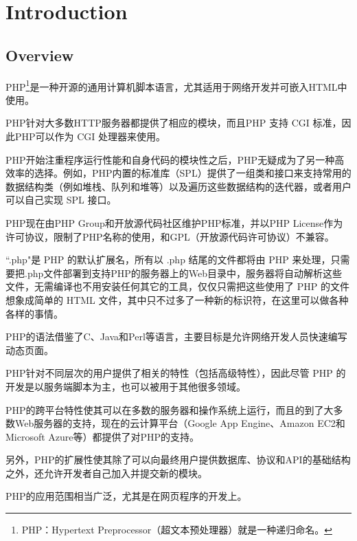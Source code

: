 \part{Introduction}

\chapter{Overview}

PHP\footnote{PHP：Hypertext Preprocessor（超文本预处理器）就是一种递归命名。}是一种开源的通用计算机脚本语言，尤其适用于网络开发并可嵌入HTML中使用。


PHP针对大多数HTTP服务器都提供了相应的模块，而且PHP 支持 CGI 标准，因此PHP可以作为 CGI 处理器来使用。

PHP开始注重程序运行性能和自身代码的模块性之后，PHP无疑成为了另一种高效率的选择。例如，PHP内置的标准库（SPL）提供了一组类和接口来支持常用的数据结构类（例如堆栈、队列和堆等）以及遍历这些数据结构的迭代器，或者用户可以自己实现 SPL 接口。




PHP现在由PHP Group和开放源代码社区维护PHP标准，并以PHP License作为许可协议，限制了PHP名称的使用，和GPL（开放源代码许可协议）不兼容。

``.php"是 PHP 的默认扩展名，所有以 .php 结尾的文件都将由 PHP 来处理，只需要把.php文件部署到支持PHP的服务器上的Web目录中，服务器将自动解析这些文件，无需编译也不用安装任何其它的工具，仅仅只需把这些使用了 PHP 的文件想象成简单的 HTML 文件，其中只不过多了一种新的标识符，在这里可以做各种各样的事情。

PHP的语法借鉴了C、Java和Perl等语言，主要目标是允许网络开发人员快速编写动态页面。

PHP针对不同层次的用户提供了相关的特性（包括高级特性），因此尽管 PHP 的开发是以服务端脚本为主，也可以被用于其他很多领域。

PHP的跨平台特性使其可以在多数的服务器和操作系统上运行，而且的到了大多数Web服务器的支持，现在的云计算平台（Google App Engine、Amazon EC2和Microsoft Azure等）都提供了对PHP的支持。

另外，PHP的扩展性使其除了可以向最终用户提供数据库、协议和API的基础结构之外，还允许开发者自己加入并提交新的模块。



PHP的应用范围相当广泛，尤其是在网页程序的开发上。

